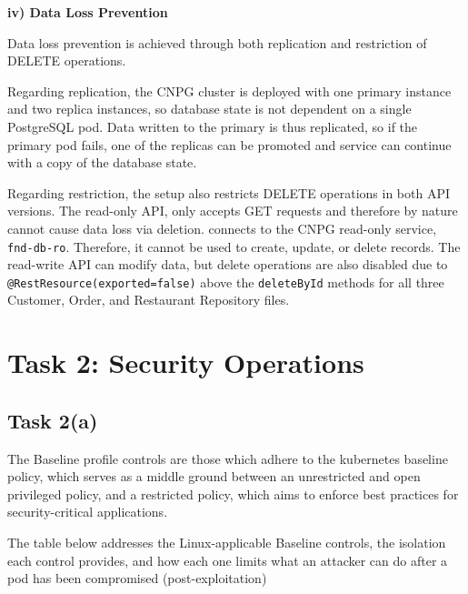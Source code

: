 \documentclass[11pt,a4paper]{article}
\begin{document}
	\textbf{iv) Data Loss Prevention}
	
	Data loss prevention is achieved through both replication and restriction of DELETE operations. 
	
	Regarding replication, the CNPG cluster is deployed with one primary instance and two replica instances, so database state is not dependent on a single PostgreSQL pod. Data written to the primary is thus replicated, so if the primary pod fails, one of the replicas can be promoted and service can continue with a copy of the database state.
	
	Regarding restriction, the setup also restricts DELETE operations in both API versions. The read-only API, only accepts GET requests and therefore by nature cannot cause data loss via deletion. connects to the CNPG read-only service, \texttt{fnd-db-ro}. Therefore, it cannot be used to create, update, or delete records. The read-write API can modify data, but delete operations are also disabled due to \texttt{@RestResource(exported=false)} above the \texttt{deleteById} methods for all three Customer, Order, and Restaurant Repository files. 
	
	
	\section{Task 2: Security Operations}
	
	\subsection{Task 2(a)}
	
	The Baseline profile controls are those which adhere to the kubernetes baseline policy, which serves as a middle ground between an unrestricted and open privileged policy, and a restricted policy, which aims to enforce best practices for security-critical applications.\cite{kubernetes documentation link from slides}
	
	The table below addresses the Linux-applicable Baseline controls, the isolation each control provides, and how each one limits what an attacker can do after a pod has been compromised (post-exploitation)
	
\end{document}
